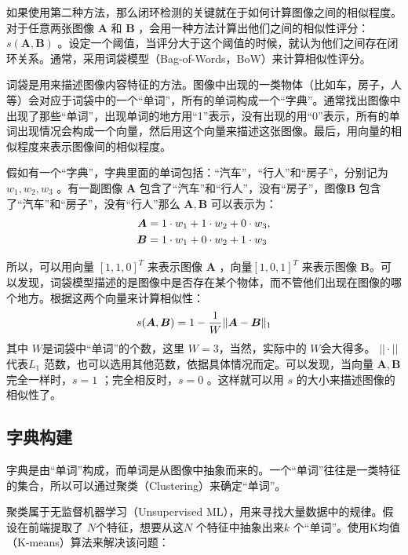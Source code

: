 如果使用第二种方法，那么闭环检测的关键就在于如何计算图像之间的相似程度。对于任意两张图像 $\bm{A} $ 和 $\bm{B} $ ，会用一种方法计算出他们之间的相似性评分：$s(\bm{A}, \bm{B}) $ 。设定一个阈值，当评分大于这个阈值的时候，就认为他们之间存在闭环关系。通常，采用词袋模型（Bag-of-Words，BoW）来计算相似性评分。

词袋是用来描述图像内容特征的方法。图像中出现的一类物体（比如车，房子，人等）会对应于词袋中的一个“单词”，所有的单词构成一个“字典”。通常找出图像中出现了那些“单词”，出现单词的地方用“1”表示，没有出现的用“0”表示，所有的单词出现情况会构成一个向量，然后用这个向量来描述这张图像。最后，用向量的相似程度来表示图像间的相似程度。

假如有一个“字典”，字典里面的单词包括：“汽车”，“行人”和“房子”，分别记为$w_1,w_2,w_3 $ 。有一副图像 $\bm{A} $ 包含了“汽车”和“行人”，没有“房子”，图像$\bm{B} $ 包含了“汽车”和“房子”，没有“行人”那么 $\bm{A},\bm{B} $ 可以表示为：
\begin{equation}
\label{eqn:4.27}
\setlength{\abovedisplayskip}{6pt}
\setlength{\belowdisplayskip}{6pt}
\begin{aligned}
\bm{A}&=1 \cdot w_{1}+1 \cdot w_{2}+0 \cdot w_{3}, \\
\bm{B}&=1 \cdot w_{1}+0 \cdot w_{2}+1 \cdot w_{3}
\end{aligned}
\end{equation}

所以，可以用向量 $[1,1,0]^{T} $ 来表示图像 $\bm{A} $ ，向量$[1,0,1]^{T} $ 来表示图像 $\bm{B} $。可以发现，词袋模型描述的是图像中是否存在某个物体，而不管他们出现在图像的哪个地方。根据这两个向量来计算相似性：
\begin{equation}
\label{eqn:4.28}
\setlength{\abovedisplayskip}{6pt}
\setlength{\belowdisplayskip}{6pt}
s(\boldsymbol{A}, \boldsymbol{B})=1-\frac{1}{W}\|\boldsymbol{A}-\boldsymbol{B}\|_{1}
\end{equation}
其中 $W $是词袋中“单词”的个数，这里 $W =3$，当然，实际中的 $W $会大得多。 $||\cdot || $代表$L_1 $ 范数，也可以选用其他范数，依据具体情况而定。可以发现，当向量 $\bm{A},\bm{B} $ 完全一样时，$s=1$ ；完全相反时，$s=0$ 。这样就可以用 $s$ 的大小来描述图像的相似性了。
\subsection{字典构建}
字典是由“单词”构成，而单词是从图像中抽象而来的。一个“单词”往往是一类特征的集合，所以可以通过聚类（Clustering）来确定“单词”。

聚类属于无监督机器学习（Unsupervised ML），用来寻找大量数据中的规律。假设在前端提取了 $N$个特征，想要从这$N$ 个特征中抽象出来$k$ 个“单词”。使用K均值（K-means）算法来解决该问题：

